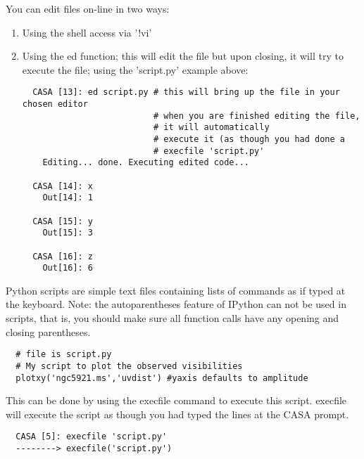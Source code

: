 \vspace{3mm}

You can edit files on-line in two ways:

\begin{enumerate}
   \item Using the shell access via '!vi'
   \item Using the ed function; this will edit the file but upon
   closing, it will try to execute the file; using the 'script.py'
   example above: 

\small
\begin{verbatim}
  CASA [13]: ed script.py # this will bring up the file in your chosen editor
                          # when you are finished editing the file, 
                          # it will automatically
                          # execute it (as though you had done a 
                          # execfile 'script.py'
    Editing... done. Executing edited code...

  CASA [14]: x
    Out[14]: 1

  CASA [15]: y
    Out[15]: 3

  CASA [16]: z
    Out[16]: 6
\end{verbatim}
\normalsize
\end{enumerate}

\vspace{3mm}

Python scripts are simple text files containing lists of commands as
if typed at the keyboard. Note: the autoparentheses feature of IPython
can not be used in scripts, that is, you should make sure all function
calls have any opening and closing parentheses. 

\small
\begin{verbatim}
  # file is script.py
  # My script to plot the observed visibilities
  plotxy('ngc5921.ms','uvdist') #yaxis defaults to amplitude
\end{verbatim}
\normalsize

This can be done by using the execfile command to execute this
script.  execfile will execute the script as though you had typed the
lines at the CASA prompt.  

\small
\begin{verbatim}
  CASA [5]: execfile 'script.py'
  --------> execfile('script.py')
\end{verbatim}
\normalsize

\vspace{3mm}

